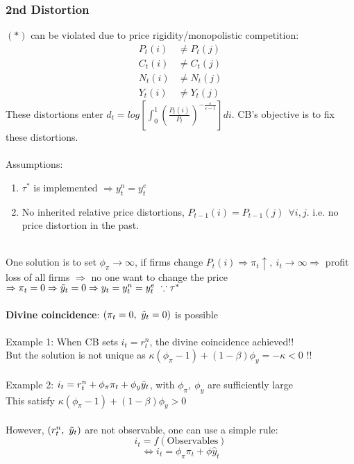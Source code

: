 \documentclass{article}
\begin{document}
\subsubsection{2nd Distortion}
$(*)$ can be violated due to price rigidity/monopolistic competition:
\begin{align*}
    P_t(i) &\neq P_t(j)\\
    C_t(i) &\neq C_t(j)\\
    N_t(i) &\neq N_t(j)\\
    Y_t(i) &\neq Y_t(j)
\end{align*}
These distortions enter $d_t = log\left[\int_0^1(\frac{P_t(i)}{P_t})^{-\frac{\varepsilon}{\varepsilon-1}}\right]di$. CB's objective is to fix these distortions.\\
\\
Assumptions:
\begin{enumerate}
    \item $\tau^*$ is implemented $\Rightarrow y_t^n = y_t^e$
    \item No inherited relative price distortions, $P_{t-1}(i) = P_{t-1}(j)\ \ \forall i, j$. i.e. no price distortion in the past.
\end{enumerate}
\\
One solution is to set $\phi_\pi \rightarrow \infty$, if firms change $P_t(i)\Rightarrow\pi_t \uparrow,\ i_t\rightarrow \infty \Rightarrow$ profit loss of all firms $\Rightarrow$ no one want to change the price $\Rightarrow \pi_t = 0 \Rightarrow \Tilde{y}_t = 0 \Rightarrow y_t = y_t^n = y_t^e\ \because\tau^*$\\
\\
\textbf{Divine coincidence}: $(\pi_t = 0,\ \Tilde{y}_t = 0)$ is possible\\
\\
Example 1: When CB sets $i_t = r_t^n$, the divine coincidence achieved!!\\
But the solution is not unique as $\kappa (\phi_\pi - 1) + (1-\beta)\phi_y = -\kappa < 0$ !!\\
\\
Example 2: $i_t = r_t^n + \phi_\pi \pi_t + \phi_y \Tilde{y}_t$, with $\phi_\pi,\ \phi_y$ are sufficiently large\\
This satisfy $\kappa (\phi_\pi - 1) + (1-\beta)\phi_y > 0$\\
\\
However, $(r_t^n,\ \Tilde{y}_t)$ are not observable, one can use a simple rule:
$$i_t = f(\text{Observables})$$
$$\Leftrightarrow i_t = \phi_\pi \pi_t + \phi \hat{y}_t$$
\end{document}
